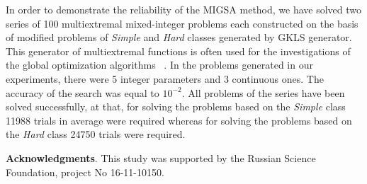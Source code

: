 \documentclass{llncs}
\begin{document}
In order to demonstrate the reliability of the MIGSA method, we have solved two series of 100 
multiextremal mixed-integer problems each constructed on the basis of modified problems of 
\textit{Simple} and \textit{Hard} classes generated by GKLS generator. %
This generator of multiextremal functions is often used for the investigations of the global optimization algorithms~ 
\cite{Paulavicius2014,SergeyevKvasov2015,Lebedev2015,Gergel2015}.
In the problems generated in our experiments, there were 5 integer parameters and 3 continuous 
ones. The accuracy of the search %
was equal to $10^{-2}$. All  
problems of the series have been solved successfully, at that, for solving the problems based on 
the \textit{Simple} class 11988 trials in average were required whereas for solving the problems based 
on the \textit{Hard} class 24750 trials were required.


\textbf{Acknowledgments}. This study was supported by the Russian Science Foundation, project No 16-11-10150.
\end{document}
